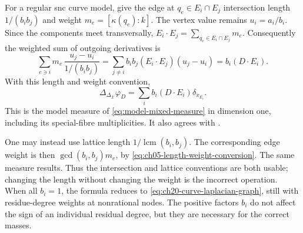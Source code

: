 \begin{remark}
\label{rem:ch20-multiplicities-lengths}
For a regular snc curve model, give the edge at
$q_e\in E_i\cap E_j$ intersection length $1/(b_i b_j)$ and
weight $m_e=[\kappa(q_e):k]$.
The vertex value remains $u_i=a_i/b_i$.
Since the components meet transversally,
$E_i\cdot E_j=\sum_{q_e\in E_i\cap E_j}m_e$.
Consequently the weighted sum of outgoing derivatives is
\[
 \sum_{e\ni i}m_e\,\frac{u_j-u_i}{1/(b_i b_j)}
      =\sum_{j\ne i}b_i b_j(E_i\cdot E_j)(u_j-u_i)
      =b_i(D\cdot E_i).
\]
With this length and weight convention,
\begin{equation}
\label{eq:ch20-curve-laplacian-general}
 \Delta_{\Delta_{\mathcal X}}\varphi_D
       =\sum_i b_i(D\cdot E_i)\delta_{x_{E_i}} .
\end{equation}
This is the model measure of \eqref{eq:model-mixed-measure} in
dimension one, including its special-fibre multiplicities.
It also agrees with .

One may instead use lattice length $1/\operatorname{lcm}(b_i,b_j)$.
The corresponding edge weight is then
$\gcd(b_i,b_j)m_e$, by \eqref{eq:ch05-length-weight-conversion}.
The same measure results.  Thus the intersection and lattice
conventions are both usable; changing the length without changing
the weight is the incorrect operation.
When all $b_i=1$, the formula reduces to
\eqref{eq:ch20-curve-laplacian-graph}, still with residue-degree
weights at nonrational nodes.
The positive factors $b_i$ do not affect the sign of an individual
residual degree, but they are necessary for the correct masses.
\end{remark}

